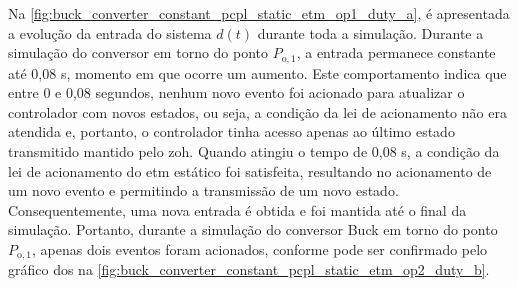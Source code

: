 Na \autoref{fig:buck_converter_constant_pcpl_static_etm_op1_duty_a}, é apresentada a evolução da entrada do sistema $d(t)$ durante toda a simulação. Durante a simulação do conversor em torno do ponto $P_{\mathrm{o}, 1}$, a entrada permanece constante até 0,08 s, momento em que ocorre um aumento. Este comportamento indica que entre 0 e 0,08 segundos, nenhum novo evento foi acionado para atualizar o controlador com novos estados, ou seja, a condição da lei de acionamento não era atendida e, portanto, o controlador tinha acesso apenas ao último estado transmitido mantido pelo \acrshort{zoh}. Quando atingiu o tempo de 0,08 s, a condição da lei de acionamento do \acrshort{etm} estático foi satisfeita, resultando no acionamento de um novo evento e permitindo a transmissão de um novo estado. Consequentemente, uma nova entrada é obtida e foi mantida até o final da simulação. Portanto, durante a simulação do conversor Buck em torno do ponto $P_{\mathrm{o}, 1}$, apenas dois eventos foram acionados, conforme pode ser confirmado pelo gráfico dos  na \autoref{fig:buck_converter_constant_pcpl_static_etm_op2_duty_b}.

